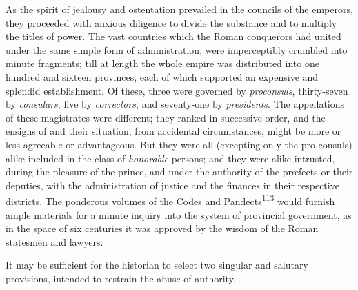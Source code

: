 As the spirit of jealousy and ostentation prevailed in the
councils of the emperors, they proceeded with anxious diligence
to divide the substance and to multiply the titles of power. The
vast countries which the Roman conquerors had united under the
same simple form of administration, were imperceptibly crumbled
into minute fragments; till at length the whole empire was
distributed into one hundred and sixteen provinces, each of which
supported an expensive and splendid establishment. Of these,
three were governed by \textit{proconsuls}, thirty-seven by \textit{consulars},
five by \textit{correctors}, and seventy-one by \textit{presidents}. The
appellations of these magistrates were different; they ranked in
successive order, and the ensigns of and their situation, from
accidental circumstances, might be more or less agreeable or
advantageous. But they were all (excepting only the pro-consuls)
alike included in the class of \textit{honorable} persons; and they were
alike intrusted, during the pleasure of the prince, and under the
authority of the præfects or their deputies, with the
administration of justice and the finances in their respective
districts. The ponderous volumes of the Codes and Pandects\textsuperscript{113}
would furnish ample materials for a minute inquiry into the
system of provincial government, as in the space of six centuries
it was approved by the wisdom of the Roman statesmen and lawyers.

It may be sufficient for the historian to select two singular and
salutary provisions, intended to restrain the abuse of authority.

